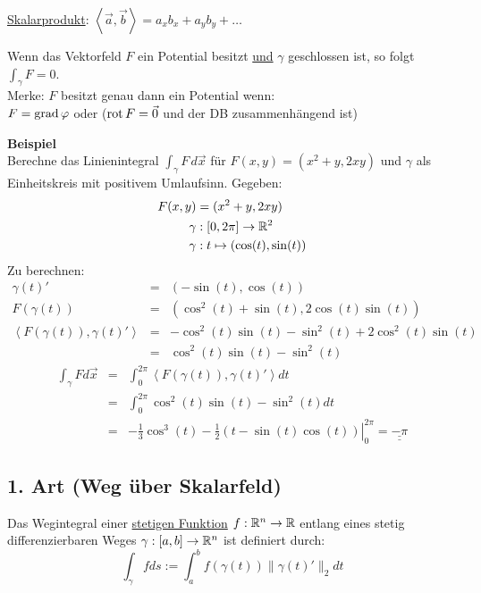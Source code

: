 \underline{Skalarprodukt}: $\left< \vec{a}, \vec{b} \right> = a_x b_x + a_y b_y + \ldots$\\

\begin{lemma}
Wenn das Vektorfeld $F$ ein Potential besitzt \uline{und} $\gamma$ geschlossen ist, so folgt $\int_\gamma F = 0$.\\
Merke: $F$ besitzt genau dann ein Potential wenn:\\
$F = \operatorname{grad} \varphi$ oder ($\operatorname{rot} F = \vec{0}$ und der DB zusammenhängend ist)
\end{lemma}

\textbf{Beispiel}\\
Berechne das Linienintegral $\int_\gamma F \, d\vec{x} $ für $ F(x,y) = (x^2+y, 2xy)$ und $\gamma$ als Einheitskreis mit positivem Umlaufsinn.
Gegeben:
\begin{align*}
F(x,y) &= (x^2+y, 2xy) \\
\gamma &: [0,2\pi]  \to \mathbb{R}^2\\
\gamma &: t \mapsto   (\cos(t), \sin(t)) 
\end{align*}
Zu berechnen:
\begin{eqnarray*}
\gamma(t)' &=& (-\sin(t),\cos(t))\\
F(\gamma(t)) &=& (\cos^2(t) + \sin(t), 2 \cos(t)\sin(t))\\
\left< F(\gamma(t)), \gamma(t)' \right> &=& -\cos^2(t)\sin(t) - \sin^2(t) + 2\cos^2(t)\sin(t)\\
 &=& \cos^2(t)\sin(t) - \sin^2(t)
\end{eqnarray*}
\begin{eqnarray*}
\int_\gamma F d\vec{x} &=& \int_0^{2\pi} \left< F(\gamma(t)), \gamma(t)' \right> dt\\
&=& \int_0^{2\pi} \cos^2(t)\sin(t) - \sin^2(t) dt\\
&=& \left. -\frac{1}{3}\cos^3(t) - \frac{1}{2}(t - \sin(t)\cos(t))
\right|_0^{2\pi} = \underline{\underline{-\pi}}
\end{eqnarray*}

\subsection{1. Art (Weg über Skalarfeld)}
Das Wegintegral einer \underline{stetigen Funktion} $f: \mathbb{R}^n \to \mathbb{R}$ entlang
eines stetig differenzierbaren Weges $\gamma: [a,b] \to \mathbb{R}^n$ ist definiert durch:
\[
\int_\gamma f ds := \int_a^b f(\gamma(t)) \|\gamma(t)'\|_2 dt
\]

